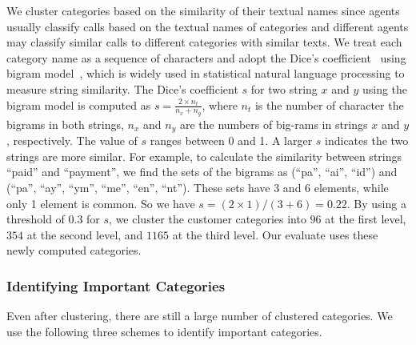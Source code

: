 We cluster categories based on the similarity of their textual names
since agents usually classify calls based on the textual names of
categories and different agents may classify similar calls to
different categories with similar texts.
We treat each category name as a sequence of characters and adopt the Dice's coefficient~\cite{wiki:dice} using bigram model~\cite{wiki:bigram}, which is widely used in statistical natural language processing to measure string similarity. 
The Dice's coefficient $s$ for two string $x$ and $y$ using the bigram model is computed as
$s=\frac{2 \times n_t}{n_x+n_y}$, 
where $n_t$ is the number of character the bigrams in both strings, $n_x$
and $n_y$ are the numbers of big-rams in strings $x$ and $y$,
respectively. The value of $s$ ranges between 0 and 1. A
larger $s$ indicates the two strings are more similar. For example, to
calculate the similarity between strings ``paid'' and ``payment'', we
find the sets of the bigrams as (``pa'', ``ai'', ``id'') and
(``pa'', ``ay'', ``ym'', ``me'', ``en'', ``nt''). These sets have 3 and
6 elements, while only 1 element is common. So we have $s=(2
\times 1)/(3 + 6)=0.22$. By using a threshold of 0.3 for $s$, 
we cluster the customer categories into $96$
at the first level, $354$ at the second level, and $1165$
at the third level. Our evaluate uses these newly computed categories.

\subsubsection{Identifying Important Categories}
\label{ssec:important}

Even after clustering, there are still a large number of clustered
categories. We use the following three schemes to identify important
categories. 



